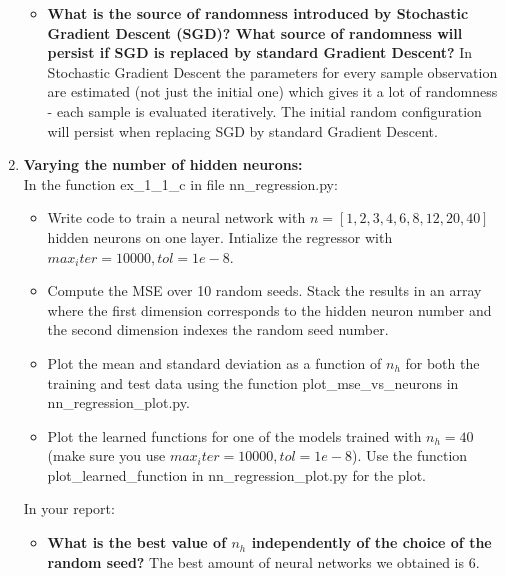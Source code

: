 \documentclass[a4paper]{article}
\begin{document}
\begin{enumerate}[label=(\alph*)]
\begin{itemize}
\item \textbf{What is the source of randomness introduced by Stochastic Gradient Descent (SGD)? What source of randomness will persist if SGD is replaced by standard Gradient Descent?}
\newline \newline
In Stochastic Gradient Descent the parameters for every sample observation are estimated (not just the initial one) which gives it a lot of randomness - each sample is evaluated iteratively.
The initial random configuration will persist when replacing SGD by standard Gradient Descent.

\end{itemize}

\newpage

\item \textbf{Varying the number of hidden neurons:}\\
	In the function ex\_1\_1\_c in file nn\_regression.py:
    \begin{itemize}
        \item Write code to train a neural network with $n = [1, 2, 3, 4, 6, 8, 12, 20, 40]$ hidden neurons on one layer. Intialize the regressor with $max_iter=10000, tol=1e-8$.
        \item Compute the MSE over 10 random seeds. Stack the results in an array where the first dimension corresponds to the hidden neuron number and the second dimension indexes the random seed number.
        \item Plot the mean and standard deviation as a function of $n_h$ for both the training and test data using the function plot\_mse\_vs\_neurons in nn\_regression\_plot.py.
		\item Plot the learned functions for one of the models trained with $n_h = 40$ (make sure you use $max_iter=10000, tol=1e-8$). Use the function plot\_learned\_function in nn\_regression\_plot.py for the plot.
    \end{itemize}
    In your report:
    \begin{itemize}
\item \textbf{What is the best value of $n_h$ independently of the choice of the random seed?}
\newline
The best amount of neural networks we obtained is 6. \\


\end{itemize}
\end{enumerate}
\end{document}
